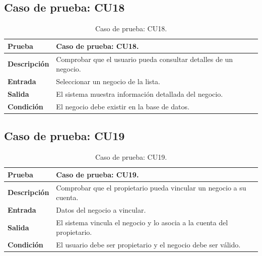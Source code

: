 
\subsection{Caso de prueba: CU18}

\begin{table}[ht]
\centering
\renewcommand{\arraystretch}{1.3}
\begin{tabular}{|p{3cm}|p{12cm}|}
\hline
\rowcolor[RGB]{191,191,191}
\textbf{Prueba} & Caso de prueba: CU18. \\
\hline
\textbf{Descripción} \cellcolor[RGB]{217,217,217} & Comprobar que el usuario pueda consultar detalles de un negocio. \\
\hline
\textbf{Entrada} \cellcolor[RGB]{217,217,217} & Seleccionar un negocio de la lista. \\
\hline
\textbf{Salida} \cellcolor[RGB]{217,217,217} & El sistema muestra información detallada del negocio. \\
\hline
\textbf{Condición} \cellcolor[RGB]{217,217,217} & El negocio debe existir en la base de datos. \\
\hline
\end{tabular}
\caption{Caso de prueba: CU18.}
\label{tab:cu18_black_test}
\end{table}


\subsection{Caso de prueba: CU19}

\begin{table}[ht]
\centering
\renewcommand{\arraystretch}{1.3}
\begin{tabular}{|p{3cm}|p{12cm}|}
\hline
\rowcolor[RGB]{191,191,191}
\textbf{Prueba} & Caso de prueba: CU19. \\
\hline
\textbf{Descripción} \cellcolor[RGB]{217,217,217} & Comprobar que el propietario pueda vincular un negocio a su cuenta. \\
\hline
\textbf{Entrada} \cellcolor[RGB]{217,217,217} & Datos del negocio a vincular. \\
\hline
\textbf{Salida} \cellcolor[RGB]{217,217,217} & El sistema vincula el negocio y lo asocia a la cuenta del propietario. \\
\hline
\textbf{Condición} \cellcolor[RGB]{217,217,217} & El usuario debe ser propietario y el negocio debe ser válido. \\
\hline
\end{tabular}
\caption{Caso de prueba: CU19.}
\label{tab:cu19_black_test}
\end{table}

